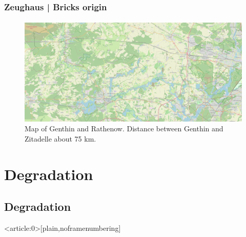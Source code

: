 \documentclass[light]{lutbeamer} %
\begin{document}
\begin{frame}
    \frametitle{Zeughaus | Bricks origin}
    \framesubtitle{}
    \vspace{5mm}
    \begin{figure}
        \centering
            \includegraphics[height=0.65\paperheight]{figures/maps/map_genthin.png}
            \caption{Map of Genthin and Rathenow. Distance between Genthin and Zitadelle about 75 km. \cite{OpenStreetMap}}
        \label{fig:enter-label}
    \end{figure}
\end{frame}

\section{Degradation}

\subsection{Degradation}
{ %
    \begin{frame}<article:0>[plain,noframenumbering]
    \end{frame}
}
\end{document}
